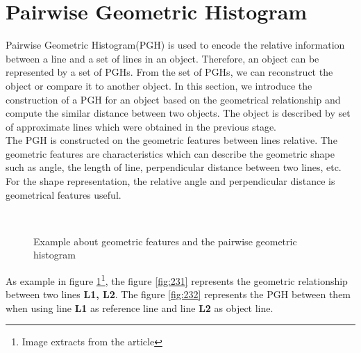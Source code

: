\section{Pairwise Geometric Histogram}
Pairwise Geometric Histogram(PGH)\cite{evans1993use} is used to encode the relative information between a line and a set of lines in an object. Therefore, an object can be represented by a set of PGHs. From the set of PGHs, we can reconstruct the object or compare it to another object. In this section, we introduce the construction of a PGH for an object based on the geometrical relationship and compute the similar distance between two objects. The object is described by set of approximate lines which were obtained in the previous stage.\\
The PGH is constructed on the geometric features between lines relative. The geometric features are characteristics which can describe the geometric shape such as angle, the length of line, perpendicular distance between two lines, etc. For the shape representation, the relative angle and perpendicular distance is geometrical features useful.\\
\begin{figure}[h!]
\centering
{}~~
\caption{Example about geometric features and the pairwise geometric histogram\cite{palaniswamy2010automatic}}
\label{fig:figure_23}
\end{figure}
As example in figure \ref{fig:figure_23}\footnote{Image extracts from the article}, the figure \ref{fig:231} represents the geometric relationship between two lines \textbf{L1, L2}. The figure \ref{fig:232} represents the PGH between them when using line \textbf{L1} as reference line and line \textbf{L2} as object line.
